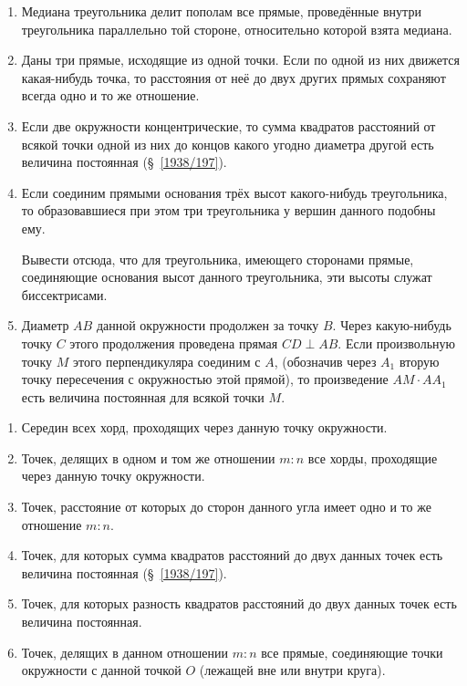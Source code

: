 \documentclass[twoside]{book}
\begin{document}
\begin{enumerate}
 \item
Медиана треугольника делит пополам все прямые, проведённые внутри треугольника параллельно той стороне, относительно которой взята медиана.

 \item
Даны три прямые, исходящие из одной точки.
Если по одной из них движется какая-нибудь точка, то расстояния от неё до двух других прямых сохраняют всегда одно и то же отношение.

 \item
Если две окружности концентрические, то сумма квадратов расстояний от всякой точки одной из них до концов какого угодно диаметра другой есть величина постоянная (§~\ref{1938/197}).

 \item
Если соединим прямыми основания трёх высот какого-нибудь треугольника, то образовавшиеся при этом три треугольника у вершин данного подобны ему.

Вывести отсюда, что для треугольника, имеющего сторонами прямые, соединяющие основания высот данного треугольника, эти высоты служат биссектрисами.

 \item
Диаметр $AB$ данной окружности продолжен за точку $B$.
Через какую-нибудь точку $C$ этого продолжения проведена прямая $CD\perp AB$.
Если произвольную точку $M$ этого перпендикуляра соединим с $A$, (обозначив через $A_1$ вторую точку пересечения с окружностью этой прямой), то произведение $AM\cdot  AA_1$ есть величина постоянная для всякой точки $M$.

\end{enumerate}

\begin{center}
\end{center}

\begin{enumerate}[resume]

 \item
Середин всех хорд, проходящих через данную точку окружности.

 \item
Точек, делящих в одном и том же отношении $m:n$ все хорды, проходящие через данную точку окружности.

\item \label{1938/upr-3-17}
Точек, расстояние от которых до сторон данного угла имеет одно и то же отношение $m:n$.

 \item
Точек, для которых сумма квадратов расстояний до двух данных точек есть величина постоянная (§~\ref{1938/197}).

 \item
Точек, для которых разность квадратов расстояний до двух данных точек есть величина постоянная.

 \item
Точек, делящих в данном отношении $m:n$ все прямые, соединяющие точки окружности с данной точкой $O$ (лежащей вне или внутри круга).

\end{enumerate}
\end{document}
